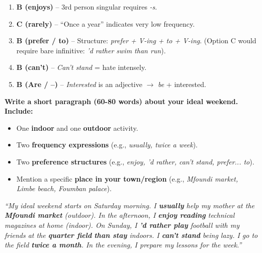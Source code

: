 \documentclass[11pt]{article}
\begin{document}
\begin{corrige}
\begin{enumerate}
    \item \textbf{B (enjoys)} -- 3rd person singular requires \emph{-s}.
    \item \textbf{C (rarely)} -- ``Once a year'' indicates very low frequency.
    \item \textbf{B (prefer / to)} -- Structure: \emph{prefer + V-ing + to + V-ing}. (Option C would require bare infinitive: \emph{'d rather swim than run}).
    \item \textbf{B (can't)} -- \emph{Can't stand} = hate intensely.
    \item \textbf{B (Are / --)} -- \emph{Interested} is an adjective $\rightarrow$ \emph{be} + interested.
\end{enumerate}
\end{corrige}

\begin{exercice}
\textbf{Write a short paragraph (60-80 words) about your ideal weekend.}
\textbf{Include:}
\begin{itemize}
    \item One \textbf{indoor} and one \textbf{outdoor} activity.
    \item Two \textbf{frequency expressions} (e.g., \emph{usually, twice a week}).
    \item Two \textbf{preference structures} (e.g., \emph{enjoy, 'd rather, can't stand, prefer... to}).
    \item Mention a specific \textbf{place in your town/region} (e.g., \emph{Mfoundi market, Limbe beach, Foumban palace}).
\end{itemize}
\end{exercice}

\begin{corrige}
\textit{``My ideal weekend starts on Saturday morning. I \textbf{usually} help my mother at the \textbf{Mfoundi market} (outdoor). In the afternoon, I \textbf{enjoy reading} technical magazines at home (indoor). On Sunday, I \textbf{'d rather play} football with my friends at the \textbf{quarter field} \textbf{than stay} indoors. I \textbf{can't stand} being lazy. I go to the field \textbf{twice a month}. In the evening, I prepare my lessons for the week.''}
\end{corrige}
\end{document}
